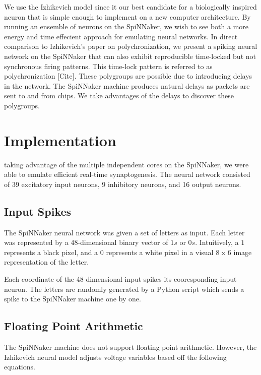\documentclass[journal]{./sty/IEEEtran}
\begin{document}
We use the Izhikevich model since it our best candidate for a biologically inspired neuron
that is simple enough to implement on a new computer architecture. 
By running an ensemble of neurons on the SpiNNaker, 
we wish to see both a more energy and time effecient approach for emulating neural networks.
In direct comparison to Izhikevich's paper on polychronization, 
we present a spiking neural network on the SpiNNaker 
that can also exhibit reproducible time-locked but not synchronous firing patterns.
This time-lock pattern is referred to as polychronization [Cite].
These polygroups are possible due to introducing delays in the network.
The SpiNNaker machine produces natural delays as packets are sent to and from chips.
We take advantages of the delays to discover these polygroups.


\section{Implementation}
 taking advantage of the multiple independent cores on the SpiNNaker, we were able to emulate efficient real-time synaptogenesis. The neural network consisted of 39 excitatory input neurons, 9 inhibitory neurons, and 16 output neurons. 

\subsection{Input Spikes}
The SpiNNaker neural network was given a set of letters as input. 
Each letter was represented by a 48-dimensional binary vector of $1s$ or $0s$.
Intuitively, a $1$ represents a black pixel, and a $0$ represents a white pixel in a visual $8$ x $6$ image representation of the letter.

Each coordinate of the 48-dimensional input spikes its cooresponding input neuron. 
The letters are randomly generated by a Python script which sends a spike to the SpiNNaker machine one by one.

\subsection{Floating Point Arithmetic}
The SpiNNaker machine does not support floating point arithmetic. 
However, the Izhikevich neural model adjusts voltage variables based off the following equations.
\end{document}
